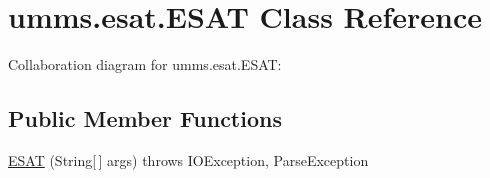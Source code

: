 \hypertarget{classumms_1_1esat_1_1_e_s_a_t}{\section{umms.\+esat.\+E\+S\+A\+T Class Reference}
\label{classumms_1_1esat_1_1_e_s_a_t}
}


Collaboration diagram for umms.\+esat.\+E\+S\+A\+T\+:
\subsection*{Public Member Functions}
\begin{DoxyCompactItemize}
\item 
\hyperlink{classumms_1_1esat_1_1_e_s_a_t_aeb2c38157e875926fe8f3a4949d600b4}{E\+S\+A\+T} (String\mbox{[}$\,$\mbox{]} args)  throws I\+O\+Exception, Parse\+Exception 
\end{DoxyCompactItemize}
